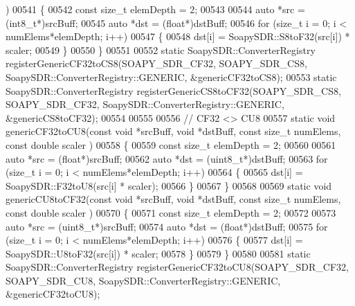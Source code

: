 \begin{DoxyCode}
      )
00541 \{
00542   \textcolor{keyword}{const} \textcolor{keywordtype}{size\_t} elemDepth = 2;
00543 
00544   \textcolor{keyword}{auto} *src = (int8\_t*)srcBuff;
00545   \textcolor{keyword}{auto} *dst = (\textcolor{keywordtype}{float}*)dstBuff;
00546   \textcolor{keywordflow}{for} (\textcolor{keywordtype}{size\_t} i = 0; i < numElems*elemDepth; i++)
00547     \{
00548       dst[i] = SoapySDR::S8toF32(src[i]) * scaler;
00549     \}
00550 \}
00551 
00552 \textcolor{keyword}{static} SoapySDR::ConverterRegistry registerGenericCF32toCS8(SOAPY_SDR_CF32, 
      SOAPY_SDR_CS8, SoapySDR::ConverterRegistry::GENERIC, &genericCF32toCS8);
00553 \textcolor{keyword}{static} SoapySDR::ConverterRegistry registerGenericCS8toCF32(SOAPY_SDR_CS8, 
      SOAPY_SDR_CF32, SoapySDR::ConverterRegistry::GENERIC, &genericCS8toCF32);
00554 
00555 
00556 \textcolor{comment}{// CF32 <> CU8}
00557 \textcolor{keyword}{static} \textcolor{keywordtype}{void} genericCF32toCU8(\textcolor{keyword}{const} \textcolor{keywordtype}{void} *srcBuff, \textcolor{keywordtype}{void} *dstBuff, \textcolor{keyword}{const} \textcolor{keywordtype}{size\_t} numElems, \textcolor{keyword}{const} \textcolor{keywordtype}{double} scaler
      )
00558 \{
00559   \textcolor{keyword}{const} \textcolor{keywordtype}{size\_t} elemDepth = 2;
00560 
00561   \textcolor{keyword}{auto} *src = (\textcolor{keywordtype}{float}*)srcBuff;
00562   \textcolor{keyword}{auto} *dst = (uint8\_t*)dstBuff;
00563   \textcolor{keywordflow}{for} (\textcolor{keywordtype}{size\_t} i = 0; i < numElems*elemDepth; i++)
00564     \{
00565       dst[i] = SoapySDR::F32toU8(src[i] * scaler);
00566     \}
00567 \}
00568 
00569 \textcolor{keyword}{static} \textcolor{keywordtype}{void} genericCU8toCF32(\textcolor{keyword}{const} \textcolor{keywordtype}{void} *srcBuff, \textcolor{keywordtype}{void} *dstBuff, \textcolor{keyword}{const} \textcolor{keywordtype}{size\_t} numElems, \textcolor{keyword}{const} \textcolor{keywordtype}{double} scaler
      )
00570 \{
00571   \textcolor{keyword}{const} \textcolor{keywordtype}{size\_t} elemDepth = 2;
00572 
00573   \textcolor{keyword}{auto} *src = (uint8\_t*)srcBuff;
00574   \textcolor{keyword}{auto} *dst = (\textcolor{keywordtype}{float}*)dstBuff;
00575   \textcolor{keywordflow}{for} (\textcolor{keywordtype}{size\_t} i = 0; i < numElems*elemDepth; i++)
00576     \{
00577       dst[i] = SoapySDR::U8toF32(src[i]) * scaler;
00578     \}
00579 \}
00580 
00581 \textcolor{keyword}{static} SoapySDR::ConverterRegistry registerGenericCF32toCU8(SOAPY_SDR_CF32, 
      SOAPY_SDR_CU8, SoapySDR::ConverterRegistry::GENERIC, &genericCF32toCU8);

\end{DoxyCode}
